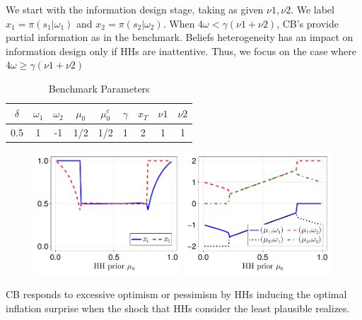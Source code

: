 \documentclass{beamer}
\begin{document}
\begin{frame}[allowframebreaks]
    \vskip10pt
    We start with the information design stage, taking as given $\nu1,\nu2$. We label $x_1=\pi(s_1|\omega_1)$ and $x_2=\pi(s_2|\omega_2)$.
    \vskip10pt
    When $4\omega<\gamma(\nu1+\nu2)$, CB's provide partial information as in the benchmark. Beliefs heterogeneity has an impact on information design only if HHs are inattentive. 
    \vskip10pt 
    Thus, we focus on the case where $4\omega\geq\gamma(\nu1+\nu2)$
    \begin{table}[htp!]
    \centering
    \begin{tabular}{@{}ccccccccc@{}}
    \toprule
    $\delta$ & $\omega_1$ & $\omega_2$ & $\mu_0$ & $\mu_0^c$ & $\gamma$ & $x_T$ & $\nu1$ & $\nu2$ \\ \midrule
    0.5      & 1          & -1         & 1/2     & 1/2       & 1      & 2     & 1 & 1    \\ \bottomrule
    \end{tabular}
    \caption{Benchmark Parameters}
    \label{tab:bchmrk_param}
    \end{table}
    \framebreak
    \begin{figure}[H]
    \centering
    \includegraphics[width=0.49\textwidth]{figures/V8/γ_1/fig_optimal_π_across_μ_0_ω_1_1_ω_2_-1_δ_0.5_.pdf}
    \includegraphics[width=0.49\textwidth]{figures/V8/γ_1/fig_posterior_across_μ_0_ω_1_1_ω_2_-1_δ_0.5_.pdf}
    \end{figure}
    CB responds to excessive optimism or pessimism by HHs inducing the optimal inflation surprise when the shock that HHs consider the least plausible realizes.

\end{frame}
\end{document}
